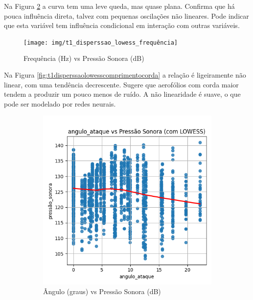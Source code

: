 \documentclass[12pt,a4paper,oneside]{report}
\newcommand{\fig}[1]{Figura \ref{#1}}
\begin{document}
Na \fig{fig:t1disperssaolowessanguloataque} a curva tem uma leve queda, mas quase plana. Confirma que há pouca influência direta, talvez com pequenas oscilações não lineares. Pode indicar que esta variável tem influência condicional em interação com outras variáveis.
\begin{figure}[H]
	\centering
	\texttt{[image: img/t1\_disperssao\_lowess\_frequência]}
	\caption{Frequência (Hz) vs Pressão Sonora (dB)}
	\label{fig:t1disperssaolowessfrequencia}
\end{figure}

Na \fig{fig:t1disperssaolowesscomprimentocorda} a relação é ligeiramente não linear, com uma tendência decrescente. Sugere que aerofólios com corda maior tendem a produzir um pouco menos de ruído. A não linearidade é suave, o que pode ser modelado por redes neurais.
\begin{figure}[!h]
	\begin{subfigure}{0.5\textwidth}
	\centering
	\includegraphics[width=\linewidth]{img/t1_disperssao_lowess_angulo_ataque}
	\caption{Ângulo (graus) vs Pressão Sonora (dB)}
	\label{fig:t1disperssaolowessanguloataque}
\end{subfigure} 
\begin{subfigure}{0.5\textwidth}
	\centering

\end{subfigure}
\end{figure}
\end{document}

